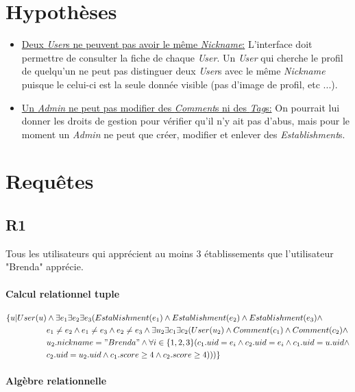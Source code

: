 \documentclass[11pt,a4paper]{report}
\begin{document}
\section*{Hypothèses}
\noindent

\begin{itemize}
\item \underline{Deux \textit{User}s ne peuvent pas avoir le même \textit{Nickname}:} L'interface doit permettre de consulter la fiche de chaque \textit{User}. Un \textit{User} qui cherche le profil de quelqu'un ne peut pas distinguer deux \textit{User}s avec le même \textit{Nickname} puisque le celui-ci est la seule donnée visible (pas d'image de profil, etc ...).
\item \underline{Un \textit{Admin} ne peut pas modifier des \textit{Comment}s ni des \textit{Tag}s:} On pourrait lui donner les droits de gestion pour vérifier qu'il n'y ait pas d'abus, mais pour le moment un \textit{Admin} ne peut que créer, modifier et enlever des \textit{Establishment}s.
\end{itemize}

\section*{Requêtes}
\subsection*{R1}
\noindent Tous les utilisateurs qui apprécient au moins 3 établissements que l'utilisateur "Brenda" apprécie.
\paragraph*{Calcul relationnel tuple}
\begin{align*}
\{ u | User(u) & \wedge \exists e_{1} \exists e_{2} \exists e_{3} ( Establishment(e_{1}) \wedge
Establishment(e_{2}) \wedge Establishment(e_{3}) \wedge \\ 
& e_{1} \neq e_{2} \wedge e_{1} \neq e_{3} \wedge e_{2} \neq e_{3} \wedge \exists u_{2} \exists c_{1} \exists c_{2} ( User(u_{2}) \wedge Comment(c_{1}) \wedge Comment(c_{2}) \wedge \\
& u_{2}.nickname = "Brenda" \wedge \forall i \in \{1,2,3 \}(c_{1}.uid=e_{i} \wedge c_{2}.uid=e_{i} \wedge c_{1}.uid = u.uid \wedge \\
&  c_{2}.uid = u_{2}.uid \wedge  c_{1}.score \geq 4 \wedge  c_{2}.score \geq 4  )))
\}
\end{align*}
\paragraph*{Algèbre relationnelle}
\end{document}
